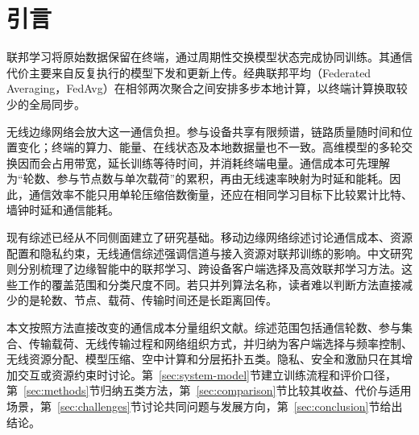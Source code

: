 \section{引言}\label{sec:introduction}

联邦学习将原始数据保留在终端，通过周期性交换模型状态完成协同训练。其通信代价主要来自反复执行的模型下发和更新上传。经典联邦平均（Federated Averaging，FedAvg）在相邻两次聚合之间安排多步本地计算，以终端计算换取较少的全局同步\cite{McMahan2017FedAvg}。

无线边缘网络会放大这一通信负担。参与设备共享有限频谱，链路质量随时间和位置变化；终端的算力、能量、在线状态及本地数据量也不一致。高维模型的多轮交换因而会占用带宽，延长训练等待时间，并消耗终端电量\cite{Lim2020MobileEdge,Niknam2020WirelessCommunications,Zhang2023EdgeFLSurvey}。通信成本可先理解为“轮数、参与节点数与单次载荷”的累积，再由无线速率映射为时延和能耗。因此，通信效率不能只用单轮压缩倍数衡量，还应在相同学习目标下比较累计比特、墙钟时延和通信能耗。

现有综述已经从不同侧面建立了研究基础。移动边缘网络综述讨论通信成本、资源配置和隐私约束\cite{Lim2020MobileEdge}，无线通信综述强调信道与接入资源对联邦训练的影响\cite{Niknam2020WirelessCommunications}。中文研究则分别梳理了边缘智能中的联邦学习、跨设备客户端选择及高效联邦学习方法\cite{Zhang2023EdgeFLSurvey,Zhang2024ClientSelectionSurvey,Ge2025EfficientFLSurvey}。这些工作的覆盖范围和分类尺度不同。若只并列算法名称，读者难以判断方法直接减少的是轮数、节点、载荷、传输时间还是长距离回传。

本文按照方法直接改变的通信成本分量组织文献。综述范围包括通信轮数、参与集合、传输载荷、无线传输过程和网络组织方式，并归纳为客户端选择与频率控制、无线资源分配、模型压缩、空中计算和分层拓扑五类。隐私、安全和激励只在其增加交互或资源约束时讨论。第~\ref{sec:system-model}节建立训练流程和评价口径，第~\ref{sec:methods}节归纳五类方法，第~\ref{sec:comparison}节比较其收益、代价与适用场景，第~\ref{sec:challenges}节讨论共同问题与发展方向，第~\ref{sec:conclusion}节给出结论。
